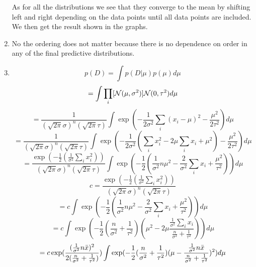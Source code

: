 \documentclass[submit]{harvardml}
\begin{document}
\begin{enumerate}
     As for all the distributions we see that they converge to the mean by shifting left and right depending on the data points until all data points are included. We then get the result shown in the graphs.
     \item
     No the ordering does not matter because there is no dependence on order in any of the final predictive distributions.
     \item
     \begin{equation*}
         p(D) = \int p(D|\mu) p(\mu) d\mu
     \end{equation*}
     \begin{equation*}
        = \int \prod_{i} [\mathcal{N}(\mu, \sigma^2)] \mathcal{N}(0, \tau^2) d\mu
     \end{equation*}
     \begin{equation*}
        = \frac{1}{(\sqrt{2\pi}\sigma)^n(\sqrt{2\pi}\tau)}\int \exp(-\frac{1}{2\sigma^2}\sum_{i} (x_i - \mu)^2 - \frac{\mu^2}{2\tau^2}) d\mu
     \end{equation*}
     \begin{equation*}
        = \frac{1}{(\sqrt{2\pi}\sigma)^n(\sqrt{2\pi}\tau)}\int \exp(-\frac{1}{2\sigma^2}(\sum_{i} x_i^2 - 2\mu\sum_{i}x_i + \mu^2) - \frac{\mu^2}{2\tau^2}) d\mu
     \end{equation*}
     \begin{equation*}
        = \frac{\exp(-\frac{1}{2}(\frac{1}{\sigma^2}\sum_{i} x_i^2))}{(\sqrt{2\pi}\sigma)^n(\sqrt{2\pi}\tau)}\int \exp(-\frac{1}{2}(\frac{1}{\sigma^2}n\mu^2 - \frac{2}{\sigma^2}\sum_{i}x_i + \frac{\mu^2}{\tau^2})) d\mu
     \end{equation*}
     \begin{equation*}
        c = \frac{\exp(-\frac{1}{2}(\frac{1}{\sigma^2}\sum_{i} x_i^2))}{(\sqrt{2\pi}\sigma)^n(\sqrt{2\pi}\tau)}
     \end{equation*}
     \begin{equation*}
        = c\int \exp(-\frac{1}{2}(\frac{1}{\sigma^2}n\mu^2 - \frac{2}{\sigma^2}\sum_{i}x_i + \frac{\mu^2}{\tau^2})) d\mu
     \end{equation*}
     \begin{equation*}
        = c\int \exp(-\frac{1}{2}(\frac{n}{\sigma^2} + \frac{1}{\tau^2})(\mu^2 - 2\mu \frac{\frac{1}{\sigma^2}\sum_{i}x_i}{\frac{n}{\sigma^2} + \frac{1}{\tau^2}})) d\mu
     \end{equation*}
     \begin{equation*}
        = c \exp(\frac{(\frac{1}{\sigma^2}n\Bar{x})^2}{2(\frac{n}{\sigma^2} + \frac{1}{\tau^2})}) \int \exp(-\frac{1}{2}(\frac{n}{\sigma^2} + \frac{1}{\tau^2})(\mu - \frac{\frac{1}{\sigma^2}n\Bar{x}}{\frac{n}{\sigma^2} + \frac{1}{\tau^2}})^2) d\mu

\end{equation*}
\end{enumerate}
\end{document}
